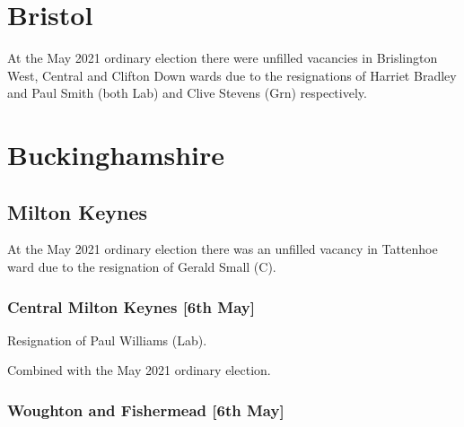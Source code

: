 \documentclass[a4paper,openany]{book}
\begin{document}
\begin{resultsiii}
\section{Bristol}

At the May 2021 ordinary election there were unfilled vacancies in Brislington West, Central and Clifton Down wards due to the resignations of Harriet Bradley and Paul Smith (both Lab) and Clive Stevens (Grn) respectively.

\section{Buckinghamshire}

\subsection*{Milton Keynes}

At the May 2021 ordinary election there was an unfilled vacancy in Tattenhoe ward due to the resignation of Gerald Small (C).

\subsubsection*{Central Milton Keynes \hspace*{\fill}\nolinebreak[1]%
	\enspace\hspace*{\fill}
	[6th May]}


Resignation of Paul Williams (Lab).

Combined with the May 2021 ordinary election.

\subsubsection*{Woughton and Fishermead \hspace*{\fill}\nolinebreak[1]%
	\enspace\hspace*{\fill}
	[6th May]}



\end{resultsiii}
\end{document}
